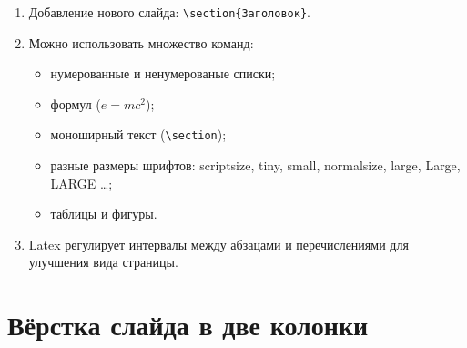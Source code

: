 \documentclass[12pt]{article}
\begin{document}
\begin{enumerate}
\item Добавление нового слайда: \verb+\section{Заголовок}+.
\item Можно использовать множество команд:
\begin{itemize}
\item нумерованные и ненумерованые списки;
\item формул ($e=mc^2$);
\item моноширный текст (\verb+\section+);
\item разные размеры шрифтов: \scriptsize scriptsize, \tiny tiny, \small small,
\normalsize normalsize, \large large, \Large Large, \LARGE LARGE \normalsize\dots;
\item таблицы и фигуры.
\end{itemize}
\item Latex регулирует интервалы между абзацами и перечислениями для улучшения вида страницы.
\end{enumerate}

\section{Вёрстка слайда в две колонки}
\end{document}

